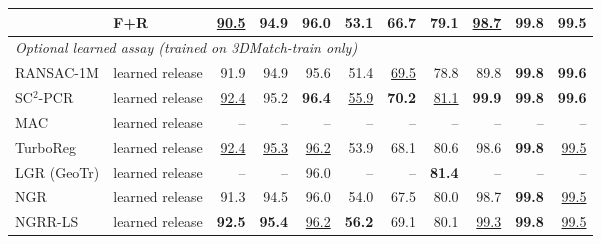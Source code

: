 \begin{tabular}{llrrrrrrrrr}
 & F+R & \underline{90.5} & \textbf{94.9} & 96.0 & \textbf{53.1} & 66.7 & 79.1 & \underline{98.7} & \textbf{99.8} & \textbf{99.5} \\
\midrule
\multicolumn{11}{l}{\emph{Optional learned assay (trained on 3DMatch-train only)}} \\
RANSAC-1M & learned release & 91.9 & 94.9 & 95.6 & 51.4 & \underline{69.5} & 78.8 & 89.8 & \textbf{99.8} & \textbf{99.6} \\
SC$^2$-PCR & learned release & \underline{92.4} & 95.2 & \textbf{96.4} & \underline{55.9} & \textbf{70.2} & \underline{81.1} & \textbf{99.9} & \textbf{99.8} & \textbf{99.6} \\
MAC & learned release & -- & -- & -- & -- & -- & -- & -- & -- & -- \\
TurboReg & learned release & \underline{92.4} & \underline{95.3} & \underline{96.2} & 53.9 & 68.1 & 80.6 & 98.6 & \textbf{99.8} & \underline{99.5} \\
LGR (GeoTr) & learned release & -- & -- & 96.0 & -- & -- & \textbf{81.4} & -- & -- & -- \\
NGR & learned release & 91.3 & 94.5 & 96.0 & 54.0 & 67.5 & 80.0 & 98.7 & \textbf{99.8} & \underline{99.5} \\
NGRR-LS & learned release & \textbf{92.5} & \textbf{95.4} & \underline{96.2} & \textbf{56.2} & 69.1 & 80.1 & \underline{99.3} & \textbf{99.8} & \underline{99.5} \\
\bottomrule
\end{tabular}
